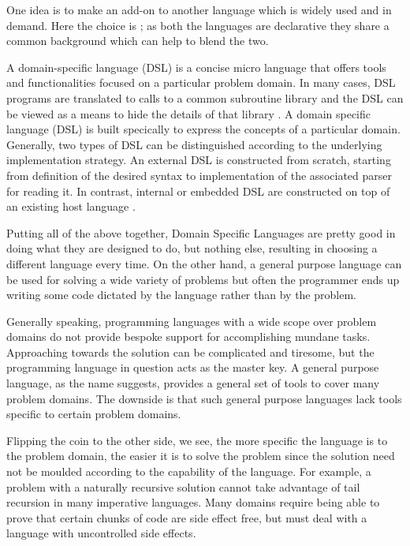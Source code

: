 \documentclass[thesis-solanki.tex]{subfiles}
\begin{document}
One idea is to make  an add-on to another language which is widely used and in demand.
Here the choice is ; as both the languages are declarative they share a common background which
can help to blend the two.

A domain-specific language (DSL) is a concise micro language that offers tools and functionalities focused on a
particular problem domain.\label{sec:DSL-def}
In many cases, DSL programs are translated to calls to a common subroutine library and the DSL can be viewed as a
means to hide the details of that library \cite{van2000domain}. A domain specific language (DSL) is built specically to express the 
concepts of a particular domain. Generally, two types of DSL can be distinguished according to the underlying implementation strategy. An
external DSL 
is constructed from scratch, starting from definition of the desired syntax to implementation of the associated parser for reading it. In contrast, internal or embedded DSL are constructed on top of an existing host language \cite{machadomodel}.

Putting all of the above together, Domain Specific Languages
are pretty good in doing what they are designed to do, but nothing else, resulting in choosing a different language
every time.
On the other hand, a general purpose language can be used for solving a wide variety of problems but often the
programmer ends up writing some code dictated by the language rather than by the problem.

Generally speaking, programming languages with a wide scope over problem domains do not provide bespoke support for
accomplishing  mundane tasks.
Approaching towards the solution can be complicated and tiresome, but the programming language in question acts as
the master key.
A general purpose language, as the name suggests, provides a general set of tools to cover many problem domains.
The downside is that such general purpose languages
lack tools specific to certain problem domains.

Flipping the coin to the other side, we see, the more specific the language is to the problem domain, the easier it
is to solve the problem since the solution need not be moulded according to the capability  of the language.
For example, a problem with a naturally recursive solution cannot take advantage of tail recursion in many
imperative languages.
Many domains require being able to prove that certain chunks of code are side effect free, but must deal with a 
language with uncontrolled side effects.
\end{document}
